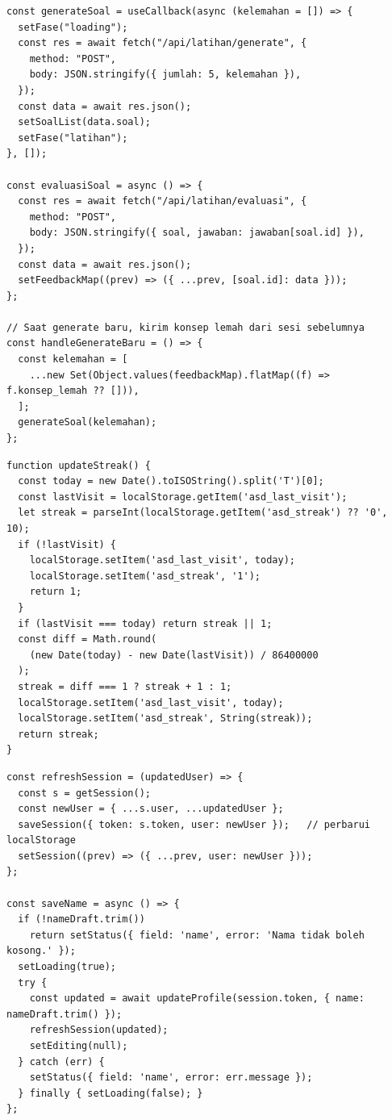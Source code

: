 \begin{lstlisting}[style=javascriptstyle, caption={Alur \textit{Generate} Soal Adaptif dan Evaluasi per Soal}, label={lst:latihan-ai}]
const generateSoal = useCallback(async (kelemahan = []) => {
  setFase("loading");
  const res = await fetch("/api/latihan/generate", {
    method: "POST",
    body: JSON.stringify({ jumlah: 5, kelemahan }),
  });
  const data = await res.json();
  setSoalList(data.soal);
  setFase("latihan");
}, []);

const evaluasiSoal = async () => {
  const res = await fetch("/api/latihan/evaluasi", {
    method: "POST",
    body: JSON.stringify({ soal, jawaban: jawaban[soal.id] }),
  });
  const data = await res.json();
  setFeedbackMap((prev) => ({ ...prev, [soal.id]: data }));
};

// Saat generate baru, kirim konsep lemah dari sesi sebelumnya
const handleGenerateBaru = () => {
  const kelemahan = [
    ...new Set(Object.values(feedbackMap).flatMap((f) => f.konsep_lemah ?? [])),
  ];
  generateSoal(kelemahan);
};
\end{lstlisting}

\begin{lstlisting}[style=javascriptstyle, caption={Fungsi Perhitungan \textit{Streak} Belajar Harian}, label={lst:progress-streak}]
function updateStreak() {
  const today = new Date().toISOString().split('T')[0];
  const lastVisit = localStorage.getItem('asd_last_visit');
  let streak = parseInt(localStorage.getItem('asd_streak') ?? '0', 10);
  if (!lastVisit) {
    localStorage.setItem('asd_last_visit', today);
    localStorage.setItem('asd_streak', '1');
    return 1;
  }
  if (lastVisit === today) return streak || 1;
  const diff = Math.round(
    (new Date(today) - new Date(lastVisit)) / 86400000
  );
  streak = diff === 1 ? streak + 1 : 1;
  localStorage.setItem('asd_last_visit', today);
  localStorage.setItem('asd_streak', String(streak));
  return streak;
}
\end{lstlisting}

\begin{lstlisting}[style=javascriptstyle, caption={Fungsi \texttt{refreshSession} dan Alur Penyimpanan Perubahan Profil}, label={lst:pengaturan-profile}]
const refreshSession = (updatedUser) => {
  const s = getSession();
  const newUser = { ...s.user, ...updatedUser };
  saveSession({ token: s.token, user: newUser });   // perbarui localStorage
  setSession((prev) => ({ ...prev, user: newUser }));
};

const saveName = async () => {
  if (!nameDraft.trim())
    return setStatus({ field: 'name', error: 'Nama tidak boleh kosong.' });
  setLoading(true);
  try {
    const updated = await updateProfile(session.token, { name: nameDraft.trim() });
    refreshSession(updated);
    setEditing(null);
  } catch (err) {
    setStatus({ field: 'name', error: err.message });
  } finally { setLoading(false); }
};
\end{lstlisting}

